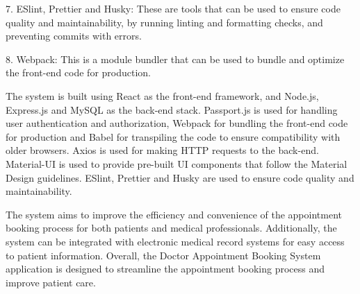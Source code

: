 7. ESlint, Prettier and Husky: These are tools that can be used to ensure code quality and maintainability, by running linting and formatting checks, and preventing commits with errors.

8. Webpack: This is a module bundler that can be used to bundle and optimize the front-end code for production.

The system is built using React as the front-end framework, and Node.js, Express.js and MySQL as the back-end stack. Passport.js is used for handling user authentication and authorization, Webpack for bundling the front-end code for production and Babel for transpiling the code to ensure compatibility with older browsers. Axios is used for making HTTP requests to the back-end. Material-UI is used to provide pre-built UI components that follow the Material Design guidelines. ESlint, Prettier and Husky are used to ensure code quality and maintainability.

The system aims to improve the efficiency and convenience of the appointment booking process for both patients and medical professionals. Additionally, the system can be integrated with electronic medical record systems for easy access to patient information. Overall, the Doctor Appointment Booking System application is designed to streamline the appointment booking process and improve patient care.



\thispagestyle{plain}

